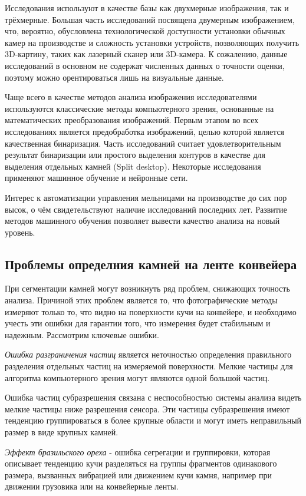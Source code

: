 \documentclass[times]{itmo-student-thesis}
\begin{document}
Исследования используют в качестве базы как двухмерные изображения, так и трёхмерные. Большая часть исследований посвящена двумерным изображением, что, вероятно, обусловлена технологической доступности установки обычных камер на производстве и сложность установки устройств, позволяющих получить 3D-картину, таких как лазерный сканер или 3D-камера. К сожалению, данные исследований в основном не содержат численных данных о точности оценки, поэтому можно орентироваться лишь на визуальные данные.

Чаще всего в качестве методов анализа изображения исследователями используются классические методы компьютерного зрения, основанные на математических преобразования изображений. Первым этапом во всех исследованиях является предобработка изображений, целью которой является качественная бинаризация. Часть исследований считает удовлетворительным результат бинаризации или простого выделения контуров в качестве для выделения отдельных камней (Split desktop). Некоторые исследования применяют машинное обучение и нейронные сети.

Интерес к автоматизации управления мельницами на производстве до сих пор высок, о чём свидетельствуют наличие исследований последних лет. Развитие методов машинного обучения позволяет вывести качество анализа на новый уровень. 


\subsection{Проблемы определния камней на ленте конвейера}

При сегментации камней могут возникнуть ряд проблем, снижающих точность анализа. Причиной этих проблем является то, что фотографические методы измеряют только то, что видно на поверхности кучи на конвейере, и необходимо учесть эти ошибки для гарантии того, что измерения будет стабильным и надежным. Рассмотрим ключевые ошибки.

\textit{Ошибка разграничения частиц} является неточностью определения правильного разделения отдельных частиц на измеряемой поверхности. Мелкие частицы для алгоритма компьютерного зрения могут являются одной большой частиц. 

Ошибка частиц субразрешения связана с неспособностью системы анализа видеть мелкие частицы ниже разрешения сенсора. Эти частицы субразрешения имеют тенденцию группироваться в более крупные области и могут иметь неправильный размер в виде крупных камней.

\textit{Эффект бразильского ореха} - ошибка сегрегации и группировки, которая описывает тенденцию кучи разделяться на группы фрагментов одинакового размера, вызванных вибрацией или движением кучи камня, например при движении грузовика или на конвейерные ленты.
\end{document}
